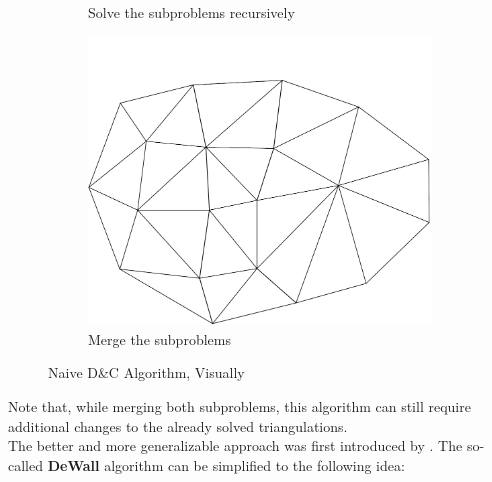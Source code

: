 \begin{figure}[H]
\begin{subfigure}[b]{0.3\textwidth}
         \caption{Solve the subproblems recursively}
         \label{fig:three sin x}
     \end{subfigure}
     \hfill
     \begin{subfigure}[b]{0.3\textwidth}
         \centering
         \includegraphics[width=\textwidth]{03SimpleConnectMiddle.png}
         \caption{Merge the subproblems}
         \label{fig:five over x}
     \end{subfigure}
        \caption{Naive D\&C Algorithm, Visually}
        \label{fig:three graphs}
\end{figure}
Note that, while merging both subproblems, this algorithm can still require additional changes to the already solved triangulations.\\
The better and more generalizable approach was first introduced by \cite{Cignoni1998}. The so-called \textbf{DeWall} algorithm can be simplified to the following idea:
